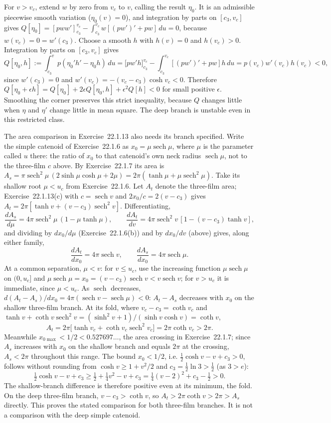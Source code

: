 For $v>v_c$, extend $w$ by zero from $v_c$ to $v$, calling the
result $\eta_0$. It is an admissible piecewise smooth variation
($\eta_0(v)=0$), and integration by parts on $[c_3,v_c]$ gives
$Q[\eta_0]=[pww']_{c_3}^{v_c}-\int_{c_3}^{v_c}w[(pw')'+pw]\,du=0$,
because $w(v_c)=0=w'(c_3)$. Choose a smooth $h$ with $h(v)=0$ and
$h(v_c)>0$. Integration by parts on $[c_3,v_c]$ gives
\[
 Q[\eta_0,h]
 :=\int_{c_3}^{v}p(\eta_0'h'-\eta_0h)\,du
 =\bigl[pw'h\bigr]_{c_3}^{v_c}-\int_{c_3}^{v_c}[(pw')'+pw]h\,du
 =p(v_c)w'(v_c)h(v_c)<0,
\]
since $w'(c_3)=0$ and $w'(v_c)=-(v_c-c_3)\cosh v_c<0$.
Therefore $Q[\eta_0+\epsilon h]=Q[\eta_0]
+2\epsilon Q[\eta_0,h]+\epsilon^2Q[h]<0$ for small positive
$\epsilon$. Smoothing the corner preserves this strict inequality,
because $Q$ changes little when $\eta$ and $\eta'$ change little in
mean square. The deep branch is unstable even in this restricted class.

The area comparison in Exercise~22.1.13 also needs its branch specified.
Write the simple catenoid of Exercise~22.1.6 as
$x_0=\mu\operatorname{sech}\mu$, where $\mu$ is the parameter called
$u$ there: the ratio of $x_0$ to that catenoid's own neck radius
$\operatorname{sech}\mu$, not to the three-film $c$ above. By
Exercise~22.1.7 its area is
$A_s=\pi\operatorname{sech}^2\mu\,(2\sinh\mu\cosh\mu+2\mu)
=2\pi(\tanh\mu+\mu\operatorname{sech}^2\mu)$. Take its shallow
root $\mu<u_c$ from Exercise~22.1.6. Let $A_t$ denote the three-film
area; Exercise~22.1.13(c) with $c=\operatorname{sech}v$ and
$2x_0/c=2(v-c_3)$ gives
$A_t=2\pi[\tanh v+(v-c_3)\operatorname{sech}^2v]$. Differentiating,
\[
\frac{dA_s}{d\mu}=4\pi\operatorname{sech}^2\mu\,(1-\mu\tanh\mu),\qquad
\frac{dA_t}{dv}=4\pi\operatorname{sech}^2v\,[1-(v-c_3)\tanh v],
\]
and dividing by $dx_0/d\mu$ (Exercise~22.1.6(b)) and by $dx_0/dv$
(above) gives, along either family,
\[
 \frac{dA_t}{dx_0}=4\pi\operatorname{sech}v,\qquad
 \frac{dA_s}{dx_0}=4\pi\operatorname{sech}\mu.
\]
At a common separation, $\mu<v$: for $v\le u_c$, use the increasing
function $\mu\operatorname{sech}\mu$ on $(0,u_c]$ and
$\mu\operatorname{sech}\mu=x_0=(v-c_3)\operatorname{sech}v
<v\operatorname{sech}v$;
for $v>u_c$ it is immediate, since $\mu<u_c$. As $\operatorname{sech}$
decreases, $d(A_t-A_s)/dx_0=4\pi(\operatorname{sech}v
-\operatorname{sech}\mu)<0$: $A_t-A_s$ decreases with $x_0$
on the shallow three-film branch. At its fold, where
$v_c-c_3=\coth v_c$ and
$\tanh v+\coth v\operatorname{sech}^2v=(\sinh^2v+1)/(\sinh v\cosh v)
=\coth v$,
\[
 A_t=2\pi\bigl[\tanh v_c+\coth v_c\operatorname{sech}^2v_c\bigr]
     =2\pi\coth v_c>2\pi.
\]
Meanwhile $x_{0\max}<1/2<0.527697\ldots$, the area crossing in
Exercise~22.1.7; since $A_s$ increases with $x_0$ on the shallow branch
and equals $2\pi$ at the crossing, $A_s<2\pi$ throughout this range.
The bound $x_0<1/2$, i.e. $\tfrac12\cosh v-v+c_3>0$, follows without
rounding from $\cosh v\ge1+v^2/2$ and $c_3=\tfrac12\ln3>\tfrac12$
(as $3>e$):
\[
 \tfrac12\cosh v-v+c_3
 \ge\tfrac12+\tfrac14v^2-v+c_3
 =\tfrac14(v-2)^2+c_3-\tfrac12>0.
\]
The shallow-branch difference is therefore positive even at its
minimum, the fold. On the deep three-film branch,
$v-c_3>\coth v$, so $A_t>2\pi\coth v>2\pi>A_s$ directly.
This proves the stated comparison for both three-film branches.
It is not a comparison with the deep simple catenoid.


